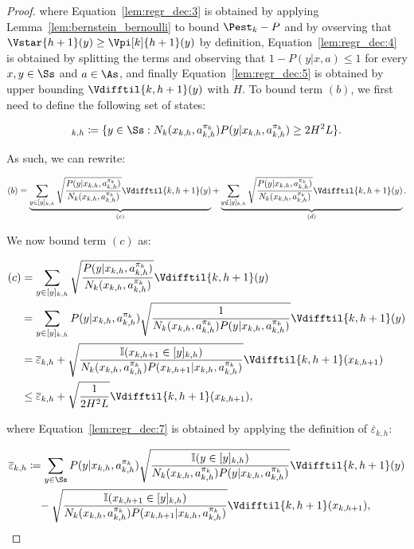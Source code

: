 \begin{proof}
where Equation~\eqref{lem:regr_dec:3} is obtained by applying Lemma~\ref{lem:bernstein_bernoulli} to bound $\Pest_k - P$ and by ovserving that $\Vstar{h+1}(y) \ge \Vpi[k]{h+1}(y)$ by definition, Equation~\eqref{lem:regr_dec:4} is obtained by splitting the terms and observing that $1 - P(y|x,a) \le 1$ for every $x,y \in \Ss$ and $a \in \As$, and finally Equation~\eqref{lem:regr_dec:5} is obtained by upper bounding $\Vdifftil{k,h+1}(y)$ with $H$.
To bound term $(b)$, we first need to define the following set of states:

\begin{equation*}
    [y]_{k,h} \coloneqq \{ y \in \Ss : N_k(x_{k,h}, a_{k,h}^{\pi_k}) P(y | x_{k,h}, a_{k,h}^{\pi_k}) \ge 2 H^2L \}.
\end{equation*}

As such, we can rewrite:

\begin{equation}
\label{lem:regr_dec:6}
    (b) = \underbrace{\sum_{y \in [y]_{k,h}}\sqrt{\frac{P(y|x_{k,h},a_{k,h}^{\pi_k})}{N_k(x_{k,h}, a_{k,h}^{\pi_k})}} \Vdifftil{k,h+1}(y)}_{(c)} + \underbrace{\sum_{y \notin [y]_{k,h}}\sqrt{\frac{P(y|x_{k,h},a_{k,h}^{\pi_k})}{N_k(x_{k,h}, a_{k,h}^{\pi_k})}} \Vdifftil{k,h+1}(y)}_{(d)}.
\end{equation}

We now bound term $(c)$ as:

\begin{align}
    (c) &= \sum_{y \in [y]_{k,h}}\sqrt{\frac{P(y|x_{k,h},a_{k,h}^{\pi_k})}{N_k(x_{k,h}, a_{k,h}^{\pi_k})}} \Vdifftil{k,h+1}(y) \nonumber \\
    &= \sum_{y \in [y]_{k,h}} P(y|x_{k,h},a_{k,h}^{\pi_k}) \sqrt{\frac{1}{N_k(x_{k,h},a_{k,h}^{\pi_k})P(y|x_{k,h},a_{k,h}^{\pi_k})}} \Vdifftil{k,h+1}(y) \nonumber \\
    &= \overline{\varepsilon}_{k,h} + \sqrt{\frac{\mathbb{I}(x_{k,h+1}\in[y]_{k,h})}{N_k(x_{k,h},a_{k,h}^{\pi_k})P(x_{k,h+1}|x_{k,h},a_{k,h}^{\pi_k})}}\Vdifftil{k,h+1}(x_{k,h+1}) \label{lem:regr_dec:7} \\
    &\le \overline{\varepsilon}_{k,h} + \sqrt{\frac{1}{2H^2L}}\Vdifftil{k,h+1}(x_{k,h+1}), \label{lem:regr_dec:8}
\end{align}

where Equation~\eqref{lem:regr_dec:7} is obtained by applying the definition of $\overline{\varepsilon}_{k,h}$:

\begin{align*}
    \overline{\varepsilon}_{k,h} &\coloneqq \sum_{y\in\Ss} P(y|x_{k,h},a_{k,h}^{\pi_k}) \sqrt{\frac{\mathbb{I}(y \in [y]_{k,h})}{N_k(x_{k,h},a_{k,h}^{\pi_k})P(y|x_{k,h},a_{k,h}^{\pi_k})}} \Vdifftil{k,h+1}(y) \\
    &\quad - \sqrt{\frac{\mathbb{I}(x_{k,h+1} \in [y]_{k,h})}{N_k(x_{k,h},a_{k,h}^{\pi_k})P(x_{k,h+1}|x_{k,h},a_{k,h}^{\pi_k})}} \Vdifftil{k,h+1}(x_{k,h+1}),
\end{align*}


\end{proof}

